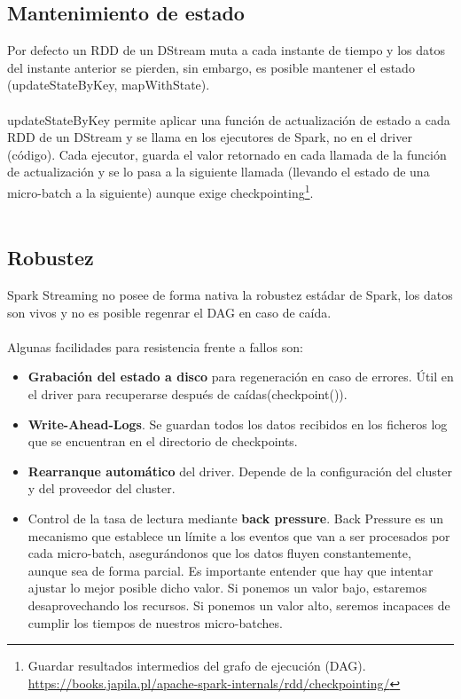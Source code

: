 \subsection{Mantenimiento de estado}
Por defecto un RDD de un DStream muta a cada instante de tiempo y los datos del instante anterior se pierden, sin embargo, es posible mantener el estado (updateStateByKey, mapWithState).\\\\
updateStateByKey permite aplicar una función de actualización de estado a cada RDD de un DStream y se llama en los ejecutores de Spark, no en el driver (código). Cada ejecutor, guarda el valor retornado en cada llamada de la función de actualización y se lo pasa a la siguiente llamada (llevando el estado de una micro-batch a la siguiente) aunque exige checkpointing\footnote{Guardar resultados intermedios del grafo de ejecución (DAG). \url{https://books.japila.pl/apache-spark-internals/rdd/checkpointing/} }.\\\\
\subsection{Robustez}
Spark Streaming no posee de forma nativa la robustez estádar de Spark, los datos son vivos y no es posible regenrar el DAG en caso de caída.\\\\
Algunas facilidades para resistencia frente a fallos son:
\begin{itemize}
	\item \textbf{Grabación del estado a disco} para regeneración en caso de errores. Útil en el driver para recuperarse después de caídas(checkpoint()).
	\item \textbf{Write-Ahead-Logs}. Se guardan todos los datos recibidos en los ficheros log que se encuentran en el directorio de checkpoints.
	\item \textbf{Rearranque automático} del driver. Depende de la configuración del cluster y del proveedor del cluster.
	\item Control de la tasa de lectura mediante \textbf{back pressure}. Back Pressure es un mecanismo que establece un límite a los eventos que van a ser procesados por cada micro-batch, asegurándonos que los datos fluyen constantemente, aunque sea de forma parcial. Es importante entender que hay que intentar ajustar lo mejor posible dicho valor. Si ponemos un valor bajo, estaremos desaprovechando los recursos. Si ponemos un valor alto, seremos incapaces de cumplir los tiempos de nuestros micro-batches.
\end{itemize}
